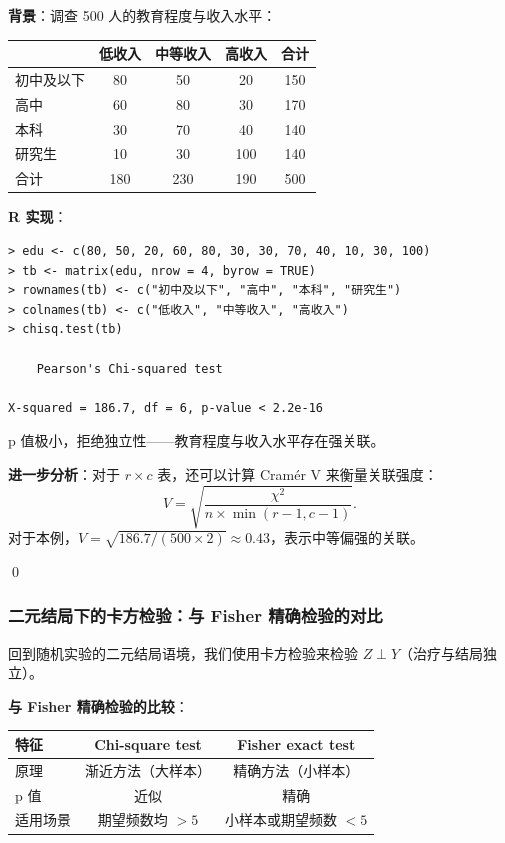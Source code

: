 \begin{Example}\label{ex:education-income}
\textbf{背景}：调查 500 人的教育程度与收入水平：

\begin{center}
\begin{tabular}{lcccc}
\hline
        & 低收入 & 中等收入 & 高收入 & 合计\\\hline
初中及以下 & 80 & 50 & 20 & 150\\
高中      & 60 & 80 & 30 & 170\\
本科      & 30 & 70 & 40 & 140\\
研究生    & 10 & 30 & 100 & 140\\\hline
合计     & 180 & 230 & 190 & 500
\end{tabular}
\end{center}

\textbf{R 实现}：
\begin{verbatim}
> edu <- c(80, 50, 20, 60, 80, 30, 30, 70, 40, 10, 30, 100)
> tb <- matrix(edu, nrow = 4, byrow = TRUE)
> rownames(tb) <- c("初中及以下", "高中", "本科", "研究生")
> colnames(tb) <- c("低收入", "中等收入", "高收入")
> chisq.test(tb)

    Pearson's Chi-squared test

X-squared = 186.7, df = 6, p-value < 2.2e-16
\end{verbatim}

p 值极小，拒绝独立性——教育程度与收入水平存在强关联。

\textbf{进一步分析}：对于 $r \times c$ 表，还可以计算 Cramér V 来衡量关联强度：
\begin{equation}
V = \sqrt{\frac{\chi^2}{n \times \min(r-1, c-1)}}.
\label{eq:cramer-v}
\end{equation}
对于本例，$V = \sqrt{186.7 / (500 \times 2)} \approx 0.43$，表示中等偏强的关联。

\qed
\end{Example}

\subsubsection{二元结局下的卡方检验：与 Fisher 精确检验的对比}

回到随机实验的二元结局语境，我们使用卡方检验来检验 $Z \perp Y$（治疗与结局独立）。

\textbf{与 Fisher 精确检验的比较}：

\begin{center}
\begin{tabular}{lcc}
\hline
特征 & Chi-square test & Fisher exact test \\\hline
原理 & 渐近方法（大样本） & 精确方法（小样本）\\
p 值 & 近似 & 精确\\
适用场景 & 期望频数均 $>5$ & 小样本或期望频数 $<5$\\\hline
\end{tabular}
\end{center}

